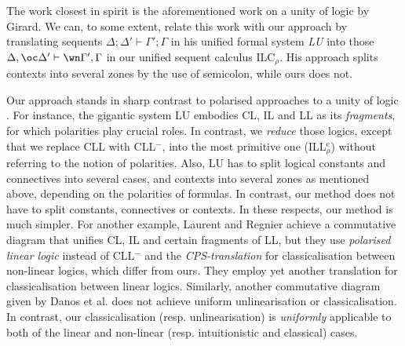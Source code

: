 \documentclass[a4paper]{article}
\theoremstyle{definition}
\theoremstyle{theorem}
\theoremstyle{remark}
\begin{document}
The work closest in spirit is the aforementioned work on a unity of logic \cite{girard1993unity} by Girard.
We can, to some extent, relate this work with our approach by translating sequents $\Delta ; \Delta' \vdash \Gamma' ; \Gamma$ in his unified formal system \emph{\textsf{LU}} into those $\Delta, \oc \Delta' \vdash \wn \Gamma', \Gamma$ in our unified sequent calculus \textsf{ILC}$_\rho$.
His approach splits contexts into several zones by the use of semicolon, while ours does not. %

Our approach stands in sharp contrast to polarised approaches to a unity of logic \cite{girard1993unity,mellies2010resource,laurent2003translations}.
For instance, the gigantic system \textsf{LU} embodies CL, IL and LL as its \emph{fragments}, for which polarities play crucial roles.
In contrast, we \emph{reduce} those logics, except that we replace CLL with CLL$^-$, into the most primitive one (ILL$^{\text{e}}_\rho$) without referring to the notion of polarities.
Also, \textsf{LU} has to split logical constants and connectives into several cases, and contexts into several zones as mentioned above, depending on the polarities of formulas.
In contrast, our method does not have to split constants, connectives or contexts.
In these respects, our method is much simpler.
For another example, Laurent and Regnier \cite{laurent2003translations} achieve a commutative diagram that unifies CL, IL and certain fragments of LL, but they use \emph{polarised linear logic} instead of CLL$^-$ and the \emph{CPS-translation} for classicalisation between non-linear logics, which differ from ours.
They employ yet another translation for classicalisation between linear logics.
Similarly, another commutative diagram \cite[Figure~7]{danos1997new} given by Danos et al. does not achieve uniform unlinearisation or classicalisation.
In contrast, our classicalisation (resp. unlinearisation) is \emph{uniformly} applicable to both of the linear and non-linear (resp. intuitionistic and classical) cases. %
\end{document}
